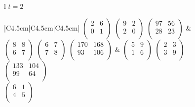 \begin{przyklad}
\begin{figure}[H]
\begin{tabular}{l}
\normalsize{\(t=2\)} \\
\begin{tabular}{|C{4.5cm}|C{4.5cm}|C{4.5cm}|}
\hline
\(\begin{pmatrix}
        2 & 6 \\
        0 & 1 \\    
\end{pmatrix}\)
\(\begin{pmatrix}
        9 & 2 \\
        2 & 0 \\    
\end{pmatrix}\)
\(\begin{pmatrix}
        97 & 56 \\
        28 & 23 \\    
\end{pmatrix}\) &
\(\begin{pmatrix}
        8 & 8 \\
        6 & 7 \\    
\end{pmatrix}\)
\(\begin{pmatrix}
        6 & 7 \\
        7 & 8 \\    
\end{pmatrix}\)
\(\begin{pmatrix}
        170 & 168 \\
        93 & 106 \\    
\end{pmatrix}\) &
\(\begin{pmatrix}
        5 & 9 \\
        1 & 6 \\    
\end{pmatrix}\)
 \(\begin{pmatrix}
        2 & 3 \\
        3 & 9 \\    
\end{pmatrix}\)
\(\begin{pmatrix}
        133 & 104 \\
        99 & 64 \\    
\end{pmatrix}\) \\
\hline
\(\begin{pmatrix}
        6 & 1 \\
        4 & 5 \\    
\end{pmatrix}\)

\end{tabular}
\end{tabular}
\end{figure}
\end{przyklad}
